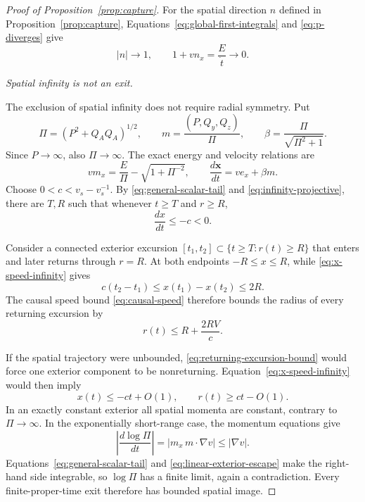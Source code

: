 \documentclass[10pt]{article}
\begin{document}
\begin{proof}[Proof of Proposition~\ref{prop:capture}]
For the spatial direction \(n\) defined in Proposition~\ref{prop:capture},
Equations~\eqref{eq:global-first-integrals} and \eqref{eq:p-diverges} give
\begin{equation}
  |n|\longrightarrow1,
  \qquad
  1+vn_x=\frac{E}{\dot t}\longrightarrow0.
  \label{eq:n-limit}
\end{equation}

\medskip\noindent\emph{Spatial infinity is not an exit.}

The exclusion of spatial infinity does not require radial symmetry.  Put
\begin{equation}
  \Pi=(P^2+Q_AQ_A)^{1/2},\qquad
  m=\frac{(P,Q_y,Q_z)}{\Pi},\qquad
  \beta=\frac{\Pi}{\sqrt{\Pi^2+1}} .
\end{equation}
Since \(P\to\infty\), also \(\Pi\to\infty\).  The exact energy and velocity
relations are
\begin{equation}
  vm_x=\frac{E}{\Pi}-\sqrt{1+\Pi^{-2}},
  \qquad
  \frac{d\boldsymbol{x}}{dt}=ve_x+\beta m .
  \label{eq:infinity-projective}
\end{equation}
Choose \(0<c<v_s-v_s^{-1}\).  By
\eqref{eq:general-scalar-tail} and \eqref{eq:infinity-projective}, there are
\(T,R\) such that whenever \(t\geq T\) and \(r\geq R\),
\begin{equation}
  \frac{dx}{dt}\leq-c<0.
  \label{eq:x-speed-infinity}
\end{equation}

Consider a connected exterior excursion
\([t_1,t_2]\subset\{t\geq T:r(t)\geq R\}\) that enters and later returns
through \(r=R\).  At both endpoints \(-R\leq x\leq R\), while
\eqref{eq:x-speed-infinity} gives
\begin{equation}
  c(t_2-t_1)\leq x(t_1)-x(t_2)\leq2R.
\end{equation}
The causal speed bound \eqref{eq:causal-speed} therefore bounds the radius of
every returning excursion by
\begin{equation}
  r(t)\leq R+\frac{2RV}{c}.
  \label{eq:returning-excursion-bound}
\end{equation}

If the spatial trajectory were unbounded,
\eqref{eq:returning-excursion-bound} would force one exterior component to be
nonreturning.  Equation~\eqref{eq:x-speed-infinity} would then imply
\begin{equation}
  x(t)\leq-ct+O(1),\qquad r(t)\geq ct-O(1).
  \label{eq:linear-exterior-escape}
\end{equation}
In an exactly constant exterior all spatial momenta are constant, contrary to
\(\Pi\to\infty\).  In the exponentially short-range case, the momentum
equations give
\begin{equation}
  \left|\frac{d\log\Pi}{dt}\right|
  =|m_x\,m\cdot\nabla v|
  \leq|\nabla v|.
\end{equation}
Equations~\eqref{eq:general-scalar-tail} and
\eqref{eq:linear-exterior-escape} make the right-hand side integrable, so
\(\log\Pi\) has a finite limit, again a contradiction.  Every
finite-proper-time exit therefore has bounded spatial image.


\end{proof}
\end{document}
